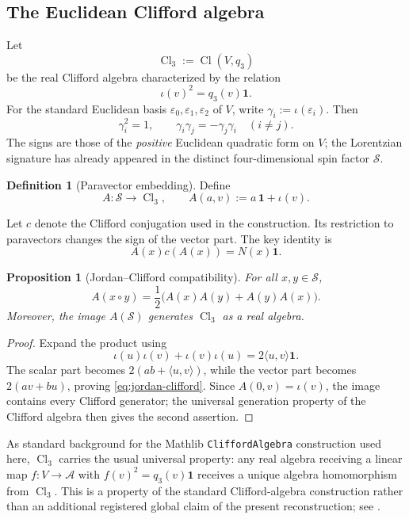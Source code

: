 \documentclass[11pt,a4paper]{article}
\newtheorem{proposition}[theorem]{Proposition}
\theoremstyle{definition}
\newtheorem{definition}[theorem]{Definition}
\theoremstyle{remark}
\newcommand{\Smodel}{\mathcal{S}}
\newcommand{\Cl}{\operatorname{Cl}}
\begin{document}
\subsection{The Euclidean Clifford algebra}

Let
\[
   \Cl_{3}:=\Cl(V,q_{3})
\]
be the real Clifford algebra characterized by the relation
\[
   \iota(v)^{2}=q_{3}(v)\mathbf{1}.
\tag{3.1}
\]
For the standard Euclidean basis
\(\varepsilon_{0},\varepsilon_{1},\varepsilon_{2}\) of \(V\), write
\(\gamma_{i}:=\iota(\varepsilon_{i})\).  Then
\[
   \gamma_{i}^{2}=1,\qquad
   \gamma_{i}\gamma_{j}=-\gamma_{j}\gamma_{i}
   \quad(i\neq j).
\tag{3.2}
\]
The signs are those of the \emph{positive} Euclidean quadratic form on
\(V\); the Lorentzian signature has already appeared in the distinct
four-dimensional spin factor \(\Smodel\).

\begin{definition}[Paravector embedding]
\label{def:paravector}
Define
\[
   A:\Smodel\longrightarrow\Cl_{3},
   \qquad
   A(a,v):=a\,\mathbf{1}+\iota(v).
\tag{3.3}
\]
\end{definition}

Let \(c\) denote the Clifford conjugation used in the construction.  Its
restriction to paravectors changes the sign of the vector part.  The key
identity is
\[
   A(x)c(A(x))=N(x)\mathbf{1}.
\tag{3.4}
\]

\begin{proposition}[Jordan--Clifford compatibility]
\label{prop:jordan-clifford}
For all \(x,y\in\Smodel\),
\[
   A(x\circ y)
   =
   \frac12\bigl(A(x)A(y)+A(y)A(x)\bigr).
\tag{3.5}\label{eq:jordan-clifford}
\]
Moreover, the image \(A(\Smodel)\) generates \(\Cl_{3}\) as a real
algebra.
\end{proposition}

\begin{proof}
Expand the product using
\[
   \iota(u)\iota(v)+\iota(v)\iota(u)
   =2\langle u,v\rangle\mathbf{1}.
\]
The scalar part becomes
\(2(ab+\langle u,v\rangle)\), while the vector part becomes
\(2(av+bu)\), proving \eqref{eq:jordan-clifford}.  Since \(A(0,v)=\iota(v)\), the image
contains every Clifford generator; the universal generation property of
the Clifford algebra then gives the second assertion.
\end{proof}

As standard background for the Mathlib \texttt{CliffordAlgebra}
construction used here, \(\Cl_{3}\) carries the usual universal property:
any real algebra receiving a linear map \(f:V\to\mathcal A\) with
\(f(v)^{2}=q_{3}(v)\mathbf1\) receives a unique algebra homomorphism from
\(\Cl_{3}\).  This is a property of the standard Clifford-algebra
construction rather than an additional registered global claim of the
present reconstruction; see \cite{Chevalley,LawsonMichelsohn}.
\end{document}
